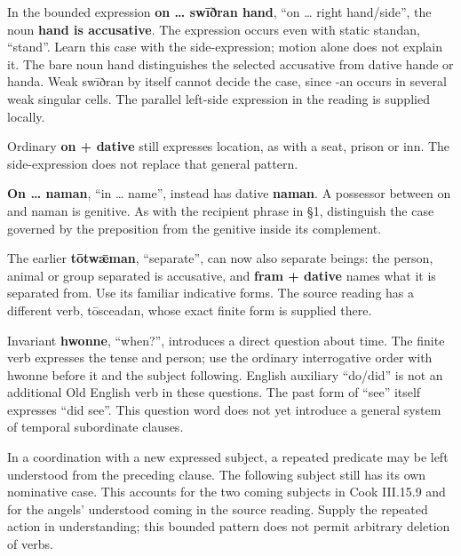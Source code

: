 In the bounded expression \textbf{on … swīðran hand}, “on … right hand/\allowbreak{}side”, the noun \textbf{hand is accusative}. The expression occurs even with static standan, “stand”. Learn this case with the side-expression; motion alone does not explain it. The bare noun hand distinguishes the selected accusative from dative hande or handa. Weak swīðran by itself cannot decide the case, since -an occurs in several weak singular cells. The parallel left-side expression in the reading is supplied locally.

Ordinary \textbf{on + dative} still expresses location, as with a seat, prison or inn. The side-expression does not replace that general pattern.

\textbf{On … naman}, “in … name”, instead has dative \textbf{naman}. A possessor between on and naman is genitive. As with the recipient phrase in §1, distinguish the case governed by the preposition from the genitive inside its complement.

The earlier \textbf{tōtwǣman}, “separate”, can now also separate beings: the person, animal or group separated is accusative, and \textbf{fram + dative} names what it is separated from. Use its familiar indicative forms. The source reading has a different verb, tōsceadan, whose exact finite form is supplied there.

Invariant \textbf{hwonne}, “when?”, introduces a direct question about time. The finite verb expresses the tense and person; use the ordinary interrogative order with hwonne before it and the subject following. English auxiliary “do/\allowbreak{}did” is not an additional Old English verb in these questions. The past form of “see” itself expresses “did see”. This question word does not yet introduce a general system of temporal subordinate clauses.

In a coordination with a new expressed subject, a repeated predicate may be left understood from the preceding clause. The following subject still has its own nominative case. This accounts for the two coming subjects in Cook III.15.9 and for the angels' understood coming in the source reading. Supply the repeated action in understanding; this bounded pattern does not permit arbitrary deletion of verbs.

